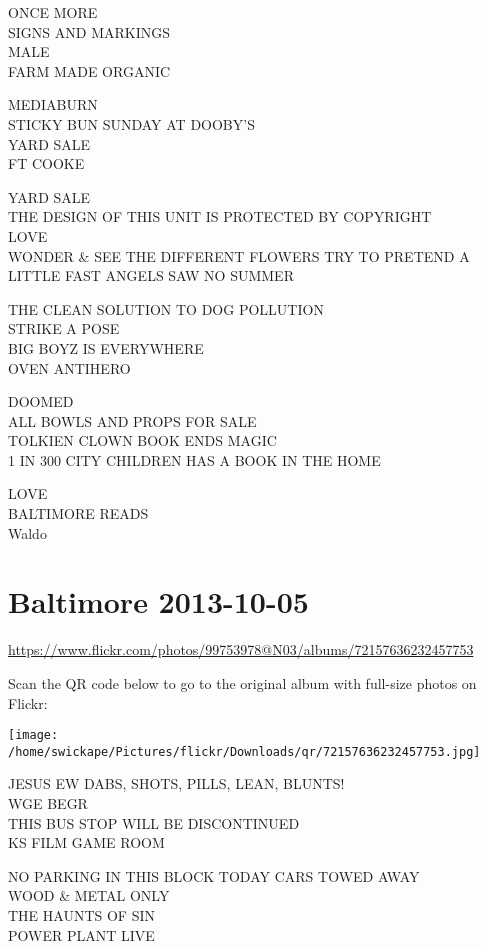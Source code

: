 \documentclass[10pt,letterpaper]{article}
\begin{document}
ONCE MORE\\
SIGNS AND MARKINGS\\
MALE\\
FARM MADE ORGANIC

MEDIABURN\\
STICKY BUN SUNDAY AT DOOBY'S\\
YARD SALE\\
FT COOKE

YARD SALE\\
THE DESIGN OF THIS UNIT IS PROTECTED BY COPYRIGHT\\
LOVE\\
WONDER \& SEE THE DIFFERENT FLOWERS TRY TO PRETEND A LITTLE FAST ANGELS SAW NO SUMMER

THE CLEAN SOLUTION TO DOG POLLUTION\\
STRIKE A POSE\\
BIG BOYZ IS EVERYWHERE\\
OVEN ANTIHERO

DOOMED\\
ALL BOWLS AND PROPS FOR SALE\\
TOLKIEN CLOWN BOOK ENDS MAGIC\\
1 IN 300 CITY CHILDREN HAS A BOOK IN THE HOME

LOVE\\
BALTIMORE READS\\
Waldo


\section*{Baltimore 2013-10-05}

\url{https://www.flickr.com/photos/99753978@N03/albums/72157636232457753}

Scan the QR code below to go to the original album with full-size photos on Flickr:

\texttt{[image: /home/swickape/Pictures/flickr/Downloads/qr/72157636232457753.jpg]}


JESUS EW DABS, SHOTS, PILLS, LEAN, BLUNTS!\\
WGE BEGR\\
THIS BUS STOP WILL BE DISCONTINUED\\
KS FILM GAME ROOM

NO PARKING IN THIS BLOCK TODAY CARS TOWED AWAY\\
WOOD \& METAL ONLY\\
THE HAUNTS OF SIN\\
POWER PLANT LIVE
\end{document}
